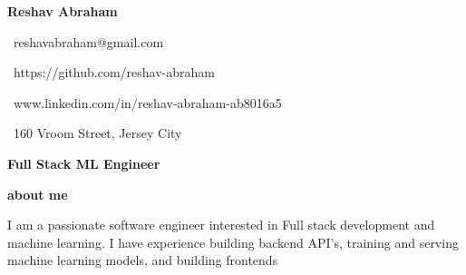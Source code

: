 \documentclass{article}
\begin{document}
\Huge\vspace{1em}\hspace{-0.30em}\textbf{Reshav Abraham} 
    \begin{minipage}[t]{0.45\textwidth\vspace{0em}\hspace{3.3em}} 
        \small
        \faEnvelopeO \, reshavabraham@gmail.com
        
        \faGithub \, https://github.com/reshav-abraham 

        \faLinkedin \, www.linkedin.com/in/reshav-abraham-ab8016a5

        \faHome \, 160 Vroom Street, Jersey City
    \end{minipage}

\vspace{-1.1em}\Large\textbf{Full Stack ML Engineer} 

\vspace{0.5em}\hspace{0em}\small\textbf{about me} 

\begin{minipage}[t]{0.6\textwidth\hspace{0em}}
I am a passionate software engineer interested in Full stack development
and machine learning. I have experience building backend API's, training and serving machine learning models, and building frontends \par
\end{minipage}

\vspace{1.3em}
\end{document}
